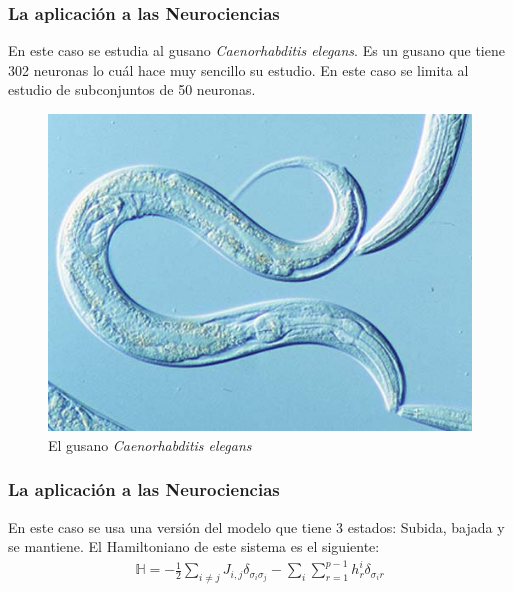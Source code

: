 \documentclass{beamer}
\begin{document}
\begin{frame}
\frametitle{La aplicación a las Neurociencias}
En este caso se estudia al gusano \textit{Caenorhabditis elegans}. Es un gusano que tiene 302 neuronas lo cuál hace muy sencillo su estudio. En este caso se limita al estudio de subconjuntos de 50 neuronas.

\begin{figure}
\centering
\includegraphics[scale=1]{fig/celegans.jpg}
\caption{El gusano \textit{Caenorhabditis elegans}}
\end{figure}

\end{frame}

\begin{frame}
\frametitle{La aplicación a las Neurociencias}

En este caso se usa una versión del modelo que tiene 3 estados: Subida, bajada y se mantiene. El Hamiltoniano de este sistema es el siguiente:
%
\begin{eqnarray}
  \mathbb{H}=-\frac{1}{2} \sum_{i \neq j}J_{i,j}\delta_{\sigma_i \sigma_j} - \sum_{i} \sum_{r=1}^{p-1}h_{r}^{i}\delta_{\sigma_{i}r}
\end{eqnarray}
%


\end{frame}
\end{document}
